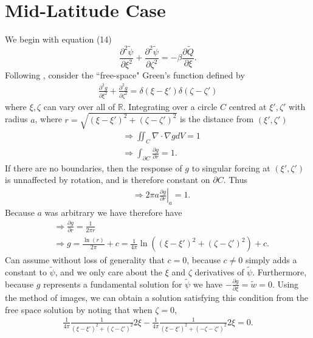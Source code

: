\documentclass[12pt]{article}
\begin{document}
\section{Mid-Latitude Case}
We begin with equation (14)
\begin{equation*}
\frac{\partial^2 \tilde{\psi}}{\partial \xi^2} + \frac{\partial^2 \tilde{\psi}}{\partial \zeta^2} = -\beta \frac{\partial \tilde{Q} }{\partial \xi}.
\end{equation*}
Following \citet{duffy01}, consider the ``free-space" Green's function defined by
\begin{align*}
\frac{\partial^2 g}{\partial \xi^2} + \frac{\partial^2 g}{\partial \zeta^2} = \delta(\xi-\xi')\delta(\zeta-\zeta')
\end{align*}
where $\xi,\zeta$ can vary over all of $\mathbb{R}$. Integrating over a circle $C$ centred at $\xi',\zeta'$ with radius $a$, where $r=\sqrt{\left(\xi-\xi'\right)^2+\left(\zeta-\zeta'\right)^2}$ is the distance from $(\xi',\zeta')$ 
\begin{align*}
& \Rightarrow \iint_C \nabla \cdot \nabla g dV = 1 \\
& \Rightarrow \int_{\partial C} \frac{\partial g}{\partial r} = 1.
\end{align*}
If there are no boundaries, then the response of $g$ to singular forcing at $(\xi',\zeta')$ is unnaffected by rotation, and is therefore constant on $\partial C$. Thus 
\begin{align*}
& \Rightarrow 2\pi a \left.\frac{\partial g}{\partial r}\right|_a = 1.
\end{align*}
Because $a$ was arbitrary we have therefore have
\begin{align*}
& \Rightarrow \frac{\partial g}{\partial r} = \frac{1}{2\pi r} \\
& \Rightarrow g = \frac{\ln\left(r \right)}{2\pi} + c = \frac{1}{4\pi}\ln\left(\left(\xi-\xi'\right)^2+\left(\zeta-\zeta'\right)^2\right) + c.
\end{align*}
Can assume without loss of generality that $c=0$, because $c\ne 0$ simply adds a constant to $\tilde{\psi}$, and we only care about the $\xi$ and $\zeta$ derivatives of $\tilde{\psi}$. Furthermore, because $g$ represents a fundamental solution for $\tilde{\psi}$ we have $-\frac{\partial g}{\partial \xi} = \tilde{w} = 0$. Using the method of images, we can obtain a solution satisfying this condition from the free space solution by noting that when $\zeta = 0$,
\begin{align*}
\frac{1}{4\pi}\frac{1}{\left(\xi-\xi'\right)^2+\left(\zeta-\zeta'\right)^2} 2\xi - \frac{1}{4\pi}\frac{1}{\left(\xi-\xi'\right)^2+\left(-\zeta-\zeta'\right)^2} 2\xi = 0.
\end{align*}
\end{document}
